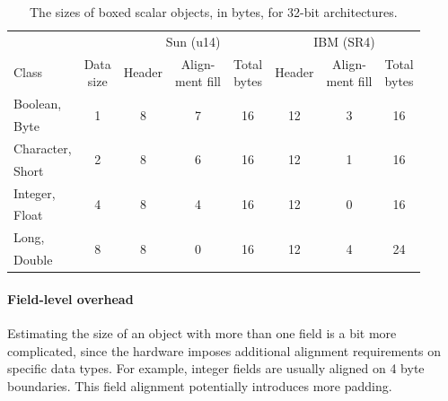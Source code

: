 \begin{table}
  \centering
	\begin{tabular}{lccccccc} \toprule
    	& & \multicolumn{3}{c}{Sun \javasix (u14)} & \multicolumn{3}{c}{IBM
    	\javasix (SR4)} \\ \cmidrule(r){3-5} \cmidrule(l){6-8}
    	Class & \shortstack[c]{Data\\size} & Header & \shortstack{Align-\\ment
    	fill} & \shortstack[c]{Total\\bytes} & Header & \shortstack{Align-\\ment
    	fill} & \shortstack[c]{Total\\bytes}
    	\\ \midrule 
    	{Boolean,} & \multirow{2}{*}{1} & \multirow{2}{*}{8} & \multirow{2}{*}{7} &
    	\multirow{2}{*}{16} & \multirow{2}{*}{12} & \multirow{2}{*}{3} &
    	\multirow{2}{*}{16}
    	\\
    	Byte & \\ \addlinespace
    	Character, & \multirow{2}{*}{2} & \multirow{2}{*}{8} & \multirow{2}{*}{6}
    	& \multirow{2}{*}{16} & \multirow{2}{*}{12} & \multirow{2}{*}{1} &
    	\multirow{2}{*}{16} \\
    	Short & \\ \addlinespace
    	Integer, & \multirow{2}{*}{4} & \multirow{2}{*}{8} & \multirow{2}{*}{4} &
    	\multirow{2}{*}{16} & \multirow{2}{*}{12} & \multirow{2}{*}{0} &
    	\multirow{2}{*}{16}
    	\\
    	Float & \\ \addlinespace
    	Long, & \multirow{2}{*}{8} & \multirow{2}{*}{8} & \multirow{2}{*}{0} &
    	\multirow{2}{*}{16} & \multirow{2}{*}{12} & \multirow{2}{*}{4} &
    	\multirow{2}{*}{24} \\
    	Double & \\
		\bottomrule
	\end{tabular}
  \caption{The sizes of boxed scalar objects, in bytes, for 32-bit
  architectures.}
  \label{tab:boxed-scalar-sizes}
\end{table}
 
\paragraph{Field-level overhead} Estimating the size of an object with more
than one field is a bit more complicated, since the hardware imposes additional alignment requirements on specific data types. For example, integer fields are usually aligned on 4 byte boundaries. This field alignment potentially introduces more padding.

